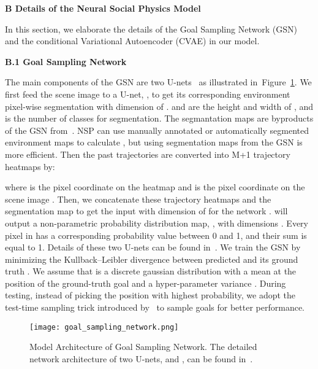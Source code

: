 \documentclass[runningheads]{llncs}
\newcommand{\Figref}[1]{Figure~\ref{fig:#1}}
\begin{document}
\vspace{15pt}
\noindent
\textbf{\Large B Details of the Neural Social Physics Model}
\vspace{15pt}

\noindent
In this section, we elaborate the details of the Goal Sampling Network (GSN) and the conditional Variational Autoencoder (CVAE) in our model.

\vspace{15pt}
\noindent
\textbf{\large B.1 Goal Sampling Network}
\vspace{10pt}

\noindent
The main components of the GSN are two U-nets~\cite{ronneberger2015u} as illustrated in~\Figref{gsn_supp}. We first feed the scene image  to a U-net, , to get its corresponding environment pixel-wise segmentation with dimension of .  and  are the height and width of , and  is the number of classes for segmentation. The segmantation maps are byproducts of the GSN from~\cite{mangalam2021goals}. NSP can use manually annotated or automatically segmented environment maps to calculate , but using segmentation maps from the GSN is more efficient. Then the past trajectories  are converted into M+1 trajectory heatmaps by:

where  is the pixel coordinate on the heatmap and  is the pixel coordinate on the scene image . Then, we concatenate these trajectory heatmaps and the segmentation map to get the input with dimension of  for the network .  will output a non-parametric probability distribution map, , with dimensions . Every pixel in  has a corresponding probability value between 0 and 1, and their sum is equal to 1. Details of these two U-nets can be found in~\cite{mangalam2021goals}. We train the GSN by minimizing the Kullback–Leibler divergence between predicted  and its ground truth . We assume that  is a discrete gaussian distribution with a mean at the position of the ground-truth goal and a hyper-parameter variance . During testing, instead of picking the position with highest probability, we adopt the test-time sampling trick introduced by~\cite{mangalam2021goals} to sample goals for better performance.

\begin{figure}[tb]
\centering
\texttt{[image: goal\_sampling\_network.png]}
\caption{Model Architecture of Goal Sampling Network. The detailed network architecture of two U-nets,  and , can be found in~\cite{mangalam2021goals}.}
\label{fig:gsn_supp}
\end{figure}
\end{document}
